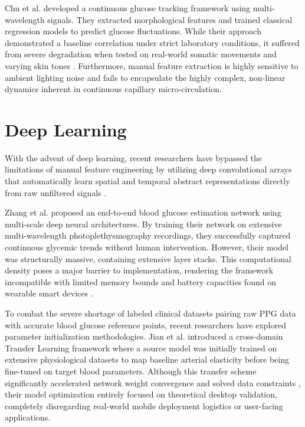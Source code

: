 Chu et al. \cite{chu2021feature} developed a continuous glucose tracking framework using multi-wavelength signals. They extracted morphological features and trained classical regression models to predict glucose fluctuations. While their approach demonstrated a baseline correlation under strict laboratory conditions, it suffered from severe degradation when tested on real-world somatic movements and varying skin tones \cite{shariati2018review}. Furthermore, manual feature extraction is highly sensitive to ambient lighting noise and fails to encapsulate the highly complex, non-linear dynamics inherent in continuous capillary micro-circulation.

\section{Deep Learning}
With the advent of deep learning, recent researchers have bypassed the limitations of manual feature engineering by utilizing deep convolutional arrays that automatically learn spatial and temporal abstract representations directly from raw unfiltered signals \cite{goodfellow2016deep}.

Zhang et al. \cite{zhang2020noninvasive} proposed an end-to-end blood glucose estimation network using multi-scale deep neural architectures. By training their network on extensive multi-wavelength photoplethysmography recordings, they successfully captured continuous glycemic trends without human intervention. However, their model was structurally massive, containing extensive layer stacks. This computational density poses a major barrier to implementation, rendering the framework incompatible with limited memory bounds and battery capacities found on wearable smart devices \cite{han2015deep}.

To combat the severe shortage of labeled clinical datasets pairing raw PPG data with accurate blood glucose reference points, recent researchers have explored parameter initialization methodologies. Jian et al. \cite{jian2024cross} introduced a cross-domain Transfer Learning framework where a source model was initially trained on extensive physiological datasets to map baseline arterial elasticity before being fine-tuned on target blood parameters. Although this transfer scheme significantly accelerated network weight convergence and solved data constraints \cite{yosinski2014how}, their model optimization entirely focused on theoretical desktop validation, completely disregarding real-world mobile deployment logistics or user-facing applications.


